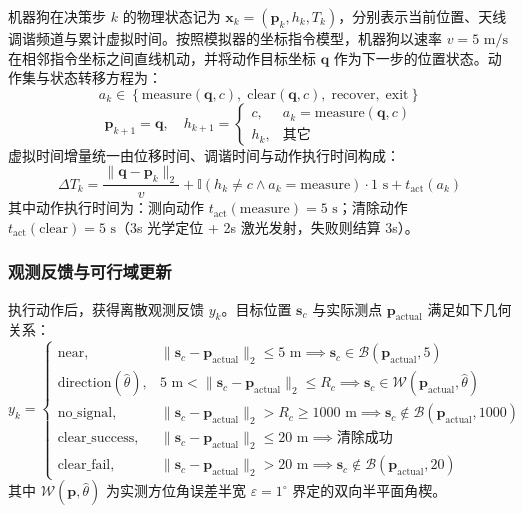 \documentclass[zihao=-4,a4paper,UTF8]{ctexart}
\begin{document}
机器狗在决策步 $k$ 的物理状态记为 $\mathbf{x}_k = (\mathbf{p}_k, h_k, T_k)$，分别表示当前位置、天线调谐频道与累计虚拟时间。按照模拟器的坐标指令模型，机器狗以速率 $v = 5\text{ m/s}$ 在相邻指令坐标之间直线机动，并将动作目标坐标 $\mathbf{q}$ 作为下一步的位置状态。动作集与状态转移方程为：
\begin{equation}
    a_k \in \left\{ \mathrm{measure}(\mathbf{q}, c),\; \mathrm{clear}(\mathbf{q}, c),\; \mathrm{recover},\; \mathrm{exit} \right\}
\end{equation}
\begin{equation}
    \mathbf{p}_{k+1} = \mathbf{q}, \quad
    h_{k+1} = \begin{cases} c, & a_k = \mathrm{measure}(\mathbf{q}, c) \\ h_k, & \text{其它} \end{cases}
\end{equation}
虚拟时间增量统一由位移时间、调谐时间与动作执行时间构成：
\begin{equation}
    \Delta T_k = \frac{\|\mathbf{q} - \mathbf{p}_k\|_2}{v} + \mathbb{I}(h_k \ne c \land a_k = \mathrm{measure}) \cdot 1\text{ s} + t_{\mathrm{act}}(a_k)
\end{equation}
其中动作执行时间为：测向动作 $t_{\mathrm{act}}(\mathrm{measure}) = 5\text{ s}$；清除动作 $t_{\mathrm{act}}(\mathrm{clear}) = 5\text{ s}$（3s 光学定位 + 2s 激光发射，失败则结算 3s）。

\subsubsection{观测反馈与可行域更新}

执行动作后，获得离散观测反馈 $y_k$。目标位置 $\mathbf{s}_c$ 与实际测点 $\mathbf{p}_{\mathrm{actual}}$ 满足如下几何关系：
\begin{equation}
    y_k = \begin{cases}
        \mathrm{near}, & \|\mathbf{s}_c - \mathbf{p}_{\mathrm{actual}}\|_2 \le 5\text{ m} \implies \mathbf{s}_c \in \mathcal{B}(\mathbf{p}_{\mathrm{actual}}, 5) \\
        \mathrm{direction}(\hat{\theta}), & 5\text{ m} < \|\mathbf{s}_c - \mathbf{p}_{\mathrm{actual}}\|_2 \le R_c \implies \mathbf{s}_c \in \mathcal{W}(\mathbf{p}_{\mathrm{actual}}, \hat{\theta}) \\
        \mathrm{no\_signal}, & \|\mathbf{s}_c - \mathbf{p}_{\mathrm{actual}}\|_2 > R_c \ge 1000\text{ m} \implies \mathbf{s}_c \notin \mathcal{B}(\mathbf{p}_{\mathrm{actual}}, 1000) \\
        \mathrm{clear\_success}, & \|\mathbf{s}_c - \mathbf{p}_{\mathrm{actual}}\|_2 \le 20\text{ m} \implies \text{清除成功} \\
        \mathrm{clear\_fail}, & \|\mathbf{s}_c - \mathbf{p}_{\mathrm{actual}}\|_2 > 20\text{ m} \implies \mathbf{s}_c \notin \mathcal{B}(\mathbf{p}_{\mathrm{actual}}, 20)
    \end{cases}
\end{equation}
其中 $\mathcal{W}(\mathbf{p}, \hat{\theta})$ 为实测方位角误差半宽 $\varepsilon = 1^\circ$ 界定的双向半平面角楔。
\end{document}
